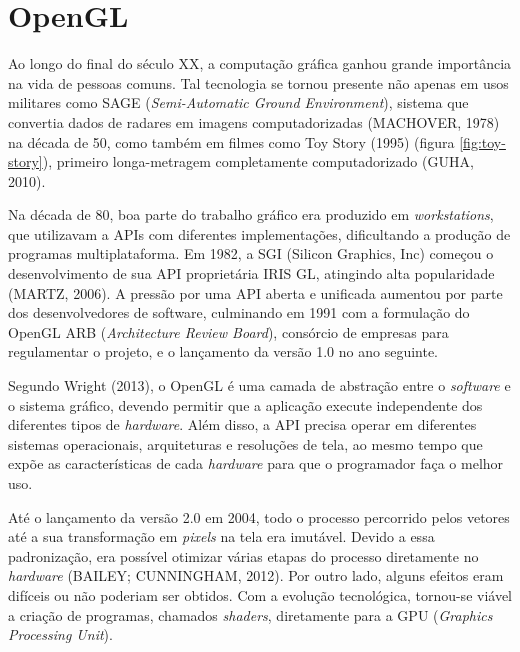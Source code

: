 \chapter{OpenGL}
Ao longo do final do século XX, a computação gráfica ganhou grande importância na vida de pessoas comuns. Tal tecnologia se tornou presente não apenas em usos militares como SAGE (\textit{Semi-Automatic Ground Environment}), sistema que convertia dados de radares em imagens computadorizadas (MACHOVER, 1978) na década de 50, como também em filmes como Toy Story (1995) (figura \ref{fig:toy-story}), primeiro longa-metragem completamente computadorizado (GUHA, 2010).


Na década de 80, boa parte do trabalho gráfico era produzido em \textit{workstations}, que utilizavam a APIs com diferentes implementações, dificultando a produção de programas multiplataforma. Em 1982, a SGI (Silicon Graphics, Inc) começou o desenvolvimento de sua API proprietária IRIS GL, atingindo alta popularidade (MARTZ, 2006). A pressão por uma API aberta e unificada aumentou por parte dos desenvolvedores de software, culminando em 1991 com a formulação do OpenGL ARB (\textit{Architecture Review Board}), consórcio de empresas para regulamentar o projeto, e o lançamento da versão 1.0 no ano seguinte.

Segundo Wright (2013), o OpenGL é uma camada de abstração entre o \textit{software} e o sistema gráfico, devendo permitir que a aplicação execute independente dos diferentes tipos de \textit{hardware}. Além disso, a API precisa operar em diferentes sistemas operacionais, arquiteturas e resoluções de tela, ao mesmo tempo que expõe as características de cada \textit{hardware} para que o programador faça o melhor uso.

Até o lançamento da versão 2.0 em 2004, todo o processo percorrido pelos vetores até a sua transformação em \textit{pixels} na tela era imutável. Devido a essa padronização, era possível otimizar várias etapas do processo diretamente no \textit{hardware} (BAILEY; CUNNINGHAM, 2012). Por outro lado, alguns efeitos eram difíceis ou não poderiam ser obtidos. Com a evolução tecnológica, tornou-se viável a criação de programas, chamados \textit{shaders}, diretamente para a GPU (\textit{Graphics Processing Unit}).

